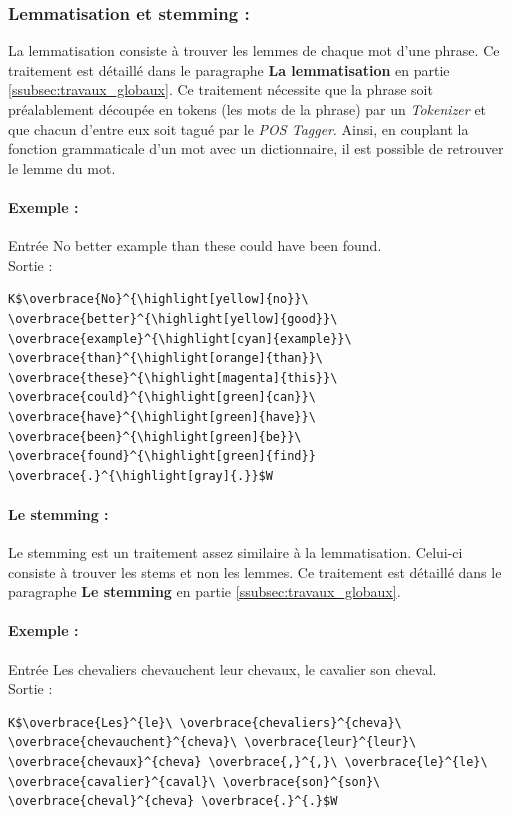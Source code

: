             \subsubsection{Lemmatisation et stemming :}
                La lemmatisation consiste à trouver les lemmes de chaque mot d'une phrase. Ce traitement est détaillé dans le paragraphe \textbf{La lemmatisation} en partie \ref{ssubsec:travaux_globaux}. Ce traitement nécessite que la phrase soit préalablement découpée en tokens (les mots de la phrase) par un \textit{Tokenizer} et que chacun d'entre eux soit tagué par le \textit{POS Tagger}. Ainsi, en couplant la fonction grammaticale d'un mot avec un dictionnaire, il est possible de retrouver le lemme du mot.

                \paragraph{Exemple :}
                Entrée \og No better example than these could have been found.\fg\\
                Sortie :
\begin{lstlisting}
K$\overbrace{No}^{\highlight[yellow]{no}}\ \overbrace{better}^{\highlight[yellow]{good}}\ \overbrace{example}^{\highlight[cyan]{example}}\ \overbrace{than}^{\highlight[orange]{than}}\ \overbrace{these}^{\highlight[magenta]{this}}\ \overbrace{could}^{\highlight[green]{can}}\ \overbrace{have}^{\highlight[green]{have}}\ \overbrace{been}^{\highlight[green]{be}}\ \overbrace{found}^{\highlight[green]{find}} \overbrace{.}^{\highlight[gray]{.}}$W
\end{lstlisting}

                \paragraph{Le stemming :}
                Le stemming est un traitement assez similaire à la lemmatisation. Celui-ci consiste à trouver les stems et non les lemmes. Ce traitement est détaillé dans le paragraphe \textbf{Le stemming} en partie \ref{ssubsec:travaux_globaux}.

                \paragraph{Exemple :}
                Entrée \og Les chevaliers chevauchent leur chevaux, le cavalier son cheval.\fg\\
                Sortie :
\begin{lstlisting}
K$\overbrace{Les}^{le}\ \overbrace{chevaliers}^{cheva}\ \overbrace{chevauchent}^{cheva}\ \overbrace{leur}^{leur}\ \overbrace{chevaux}^{cheva} \overbrace{,}^{,}\ \overbrace{le}^{le}\ \overbrace{cavalier}^{caval}\ \overbrace{son}^{son}\ \overbrace{cheval}^{cheva} \overbrace{.}^{.}$W
\end{lstlisting}


